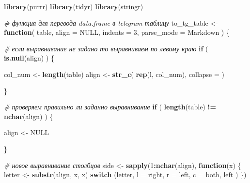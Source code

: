 \documentclass[
]{book}
\newenvironment{Shaded}{\begin{snugshade}}{\end{snugshade}}
\newcommand{\AttributeTok}[1]{\textcolor[rgb]{0.13,0.29,0.53}{#1}}
\newcommand{\CommentTok}[1]{\textcolor[rgb]{0.56,0.35,0.01}{\textit{#1}}}
\newcommand{\ConstantTok}[1]{\textcolor[rgb]{0.56,0.35,0.01}{#1}}
\newcommand{\ControlFlowTok}[1]{\textcolor[rgb]{0.13,0.29,0.53}{\textbf{#1}}}
\newcommand{\DecValTok}[1]{\textcolor[rgb]{0.00,0.00,0.81}{#1}}
\newcommand{\FunctionTok}[1]{\textcolor[rgb]{0.13,0.29,0.53}{\textbf{#1}}}
\newcommand{\NormalTok}[1]{#1}
\newcommand{\OtherTok}[1]{\textcolor[rgb]{0.56,0.35,0.01}{#1}}
\newcommand{\SpecialCharTok}[1]{\textcolor[rgb]{0.81,0.36,0.00}{\textbf{#1}}}
\newcommand{\StringTok}[1]{\textcolor[rgb]{0.31,0.60,0.02}{#1}}
\begin{document}
\begin{Shaded}
\begin{Highlighting}[]
\FunctionTok{library}\NormalTok{(purrr)}
\FunctionTok{library}\NormalTok{(tidyr)}
\FunctionTok{library}\NormalTok{(stringr)}

\CommentTok{\# функция для перевода data.frame в telegram таблицу }
\NormalTok{to\_tg\_table }\OtherTok{\textless{}{-}} \ControlFlowTok{function}\NormalTok{( table, }\AttributeTok{align =} \ConstantTok{NULL}\NormalTok{, }\AttributeTok{indents =} \DecValTok{3}\NormalTok{, }\AttributeTok{parse\_mode =} \StringTok{\textquotesingle{}Markdown\textquotesingle{}}\NormalTok{ ) \{}
  
  \CommentTok{\# если выравнивание не задано то выравниваем по левому краю}
  \ControlFlowTok{if}\NormalTok{ ( }\FunctionTok{is.null}\NormalTok{(align) ) \{}
    
\NormalTok{    col\_num }\OtherTok{\textless{}{-}} \FunctionTok{length}\NormalTok{(table)}
\NormalTok{    align   }\OtherTok{\textless{}{-}} \FunctionTok{str\_c}\NormalTok{( }\FunctionTok{rep}\NormalTok{(}\StringTok{\textquotesingle{}l\textquotesingle{}}\NormalTok{, col\_num), }\AttributeTok{collapse =} \StringTok{\textquotesingle{}\textquotesingle{}}\NormalTok{ )}
  
\NormalTok{  \}}
  
  \CommentTok{\# проверяем правильно ли заданно выравнивание}
  \ControlFlowTok{if}\NormalTok{ ( }\FunctionTok{length}\NormalTok{(table) }\SpecialCharTok{!=} \FunctionTok{nchar}\NormalTok{(align) ) \{}
    
\NormalTok{    align }\OtherTok{\textless{}{-}} \ConstantTok{NULL}
    
\NormalTok{  \}}
  
  \CommentTok{\# новое выравнивание столбцов }
\NormalTok{  side }\OtherTok{\textless{}{-}} \FunctionTok{sapply}\NormalTok{(}\DecValTok{1}\SpecialCharTok{:}\FunctionTok{nchar}\NormalTok{(align), }
         \ControlFlowTok{function}\NormalTok{(x) \{ }
\NormalTok{           letter }\OtherTok{\textless{}{-}} \FunctionTok{substr}\NormalTok{(align, x, x)}
           \ControlFlowTok{switch}\NormalTok{ (letter,}
                   \StringTok{\textquotesingle{}l\textquotesingle{}} \OtherTok{=} \StringTok{\textquotesingle{}right\textquotesingle{}}\NormalTok{,}
                   \StringTok{\textquotesingle{}r\textquotesingle{}} \OtherTok{=} \StringTok{\textquotesingle{}left\textquotesingle{}}\NormalTok{,}
                   \StringTok{\textquotesingle{}c\textquotesingle{}} \OtherTok{=} \StringTok{\textquotesingle{}both\textquotesingle{}}\NormalTok{,}
                   \StringTok{\textquotesingle{}left\textquotesingle{}}
\NormalTok{           )}
\NormalTok{  \})}
  

\end{Highlighting}
\end{Shaded}
\end{document}
